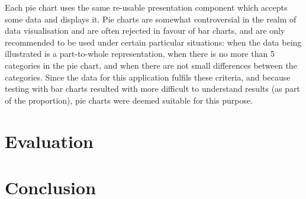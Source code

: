 \documentclass[a4paper,11pt]{report}
\begin{document}
Each pie chart uses the same re-usable presentation component which accepts some data and displays it.
Pie charts are somewhat controversial in the realm of data visualisation and are often rejected in favour of bar charts, and are only recommended to be used under certain particular situations:
when the data being illustrated is a part-to-whole representation, when there is no more than 5 categories in the pie chart, and when there are not small differences between the categories\supercite{atlassianpiechart, spotfirepie, inforirver}.
Since the data for this application fulfils these criteria, and because testing with bar charts resulted with more difficult to understand results (as part of the proportion), pie charts were deemed suitable for this purpose.

\chapter{Evaluation}
\chapter{Conclusion}









\printbibliography
\end{document}
